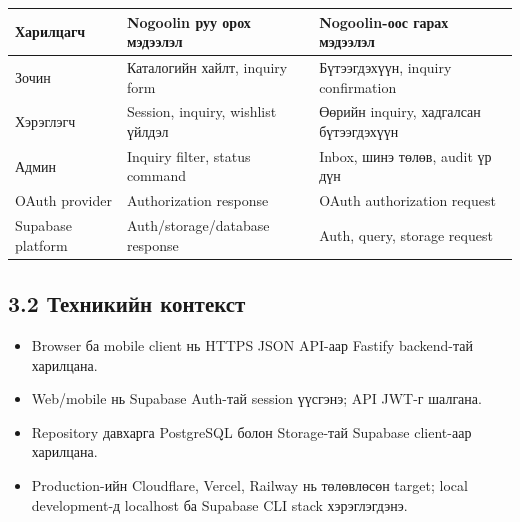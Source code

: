 \documentclass[
  mongolian,
]{article}
\providecommand{\tightlist}{%
  \setlength{\itemsep}{0pt}\setlength{\parskip}{0pt}}
\begin{document}
\begin{longtable}[]{@{}
  >{\raggedright\arraybackslash}p{}
  >{\raggedright\arraybackslash}p{}
  >{\raggedright\arraybackslash}p{}@{}}
\toprule\noalign{}
\begin{minipage}[b]{\linewidth}\raggedright
Харилцагч
\end{minipage} & \begin{minipage}[b]{\linewidth}\raggedright
Nogoolin руу орох мэдээлэл
\end{minipage} & \begin{minipage}[b]{\linewidth}\raggedright
Nogoolin-оос гарах мэдээлэл
\end{minipage} \\
\midrule\noalign{}
\endhead
\bottomrule\noalign{}
\endlastfoot
Зочин & Каталогийн хайлт, inquiry form & Бүтээгдэхүүн, inquiry
confirmation \\
Хэрэглэгч & Session, inquiry, wishlist үйлдэл & Өөрийн inquiry,
хадгалсан бүтээгдэхүүн \\
Админ & Inquiry filter, status command & Inbox, шинэ төлөв, audit үр
дүн \\
OAuth provider & Authorization response & OAuth authorization request \\
Supabase platform & Auth/storage/database response & Auth, query,
storage request \\
\end{longtable}

\subsection{3.2 Техникийн
контекст}\label{ux442ux435ux445ux43dux438ux43aux438ux439ux43d-ux43aux43eux43dux442ux435ux43aux441ux442}

\begin{itemize}
\tightlist
\item
  Browser ба mobile client нь HTTPS JSON API-аар Fastify backend-тай
  харилцана.
\item
  Web/mobile нь Supabase Auth-тай session үүсгэнэ; API JWT-г шалгана.
\item
  Repository давхарга PostgreSQL болон Storage-тай Supabase client-аар
  харилцана.
\item
  Production-ийн Cloudflare, Vercel, Railway нь төлөвлөсөн target; local
  development-д localhost ба Supabase CLI stack хэрэглэгдэнэ.
\end{itemize}
\end{document}
